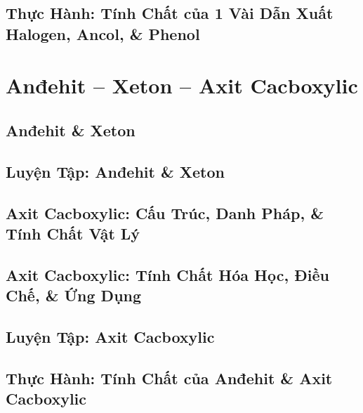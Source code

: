 \documentclass[oneside]{book}
\numberwithin{equation}{section}
\begin{document}

\section{Thực Hành: Tính Chất của 1 Vài Dẫn Xuất Halogen, Ancol, \& Phenol}


\chapter{Anđehit -- Xeton -- Axit Cacboxylic}

\section{Anđehit \& Xeton}


\section{Luyện Tập: Anđehit \& Xeton}


\section{Axit Cacboxylic: Cấu Trúc, Danh Pháp, \& Tính Chất Vật Lý}


\section{Axit Cacboxylic: Tính Chất Hóa Học, Điều Chế, \& Ứng Dụng}


\section{Luyện Tập: Axit Cacboxylic}


\section{Thực Hành: Tính Chất của Anđehit \& Axit Cacboxylic}


\printbibliography[heading=bibintoc]
	
\end{document}
